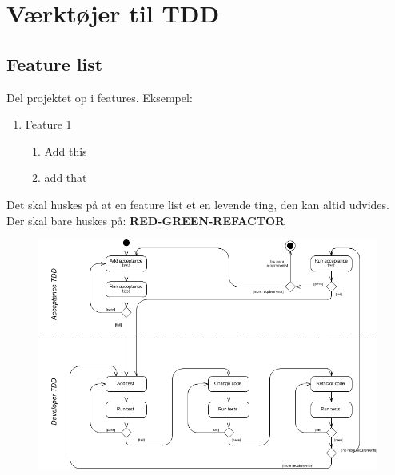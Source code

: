 \documentclass{article}
\begin{document}
\section{Værktøjer til TDD}
\subsection{Feature list}
Del projektet op i features. Eksempel: 
\begin{enumerate}
 	\item Feature 1
 	\begin{enumerate}
 		\item Add this
 		\item add that
 	\end{enumerate}
 \end{enumerate} 
Det skal huskes på at en feature list et en levende ting, den kan altid udvides. Der skal bare huskes på: \textbf{RED-GREEN-REFACTOR}

\begin{figure}[H]
	\centering
	\includegraphics[width = \textwidth]{Billede1.png}
\end{figure}
\end{document}
